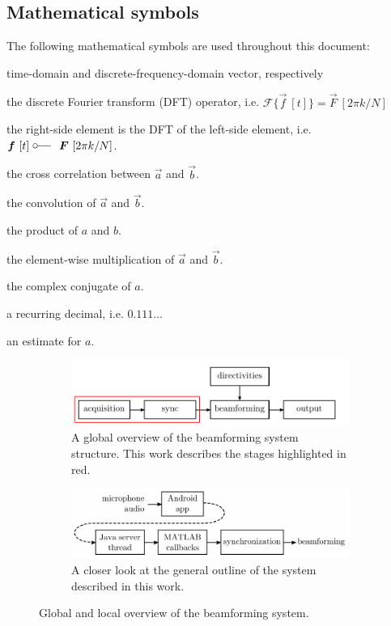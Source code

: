 \documentclass[a4paper, notitlepage]{report}
\begin{document}
\subsection{Mathematical symbols}
The following mathematical symbols are used throughout this document:
\begin{description}[labelwidth=1.5cm]
\item[$\vec{a}, \vec{A}$]	time-domain and discrete-frequency-domain vector, respectively
\item[$\mathcal{F}$]	the discrete Fourier transform (DFT) operator, i.e. $\mathcal{F}\{\vec{f}~[t]\}=\vec{F}~[2\pi k/N]$
\item[$\fourier$]	the right-side element is the DFT of the left-side element, i.e. $\vec{f}~[t]~\fourier~\vec{F}~[2\pi k/N]$.
\item[$\vec{a} \star \vec{b}$]	the cross correlation between $\vec{a}$ and $\vec{b}$.
\item[$\vec{a} * \vec{b}$]		the convolution of $\vec{a}$ and $\vec{b}$.
\item[$a\cdot b$]	the product of $a$ and $b$.
\item[$\vec{a} \odot \vec{b}$]	the element-wise multiplication of $\vec{a}$ and $\vec{b}$.
\item[$\overline{a}$]	the complex conjugate of $a$.
\item[$0.\overline{1}$]	a recurring decimal, i.e. $0.111\dots$
\item[$\hat{a}$]	an estimate for $a$.
\end{description}

\begin{figure}[bht]
	\centering
	\begin{subfigure}{0.8\textwidth}
	\includegraphics[width=\textwidth]{figures/introduction/global_overview}
		\caption[Global overview of the beamforming system structure.]{A global overview of the beamforming system structure. This work describes the stages highlighted in red.}
		\label{fig:global_overview}
	\end{subfigure}
	
	\begin{subfigure}{0.8\textwidth}
		\includegraphics[width=\textwidth]{figures/introduction/local_overview}
		\caption[General outline of system structure in this work.]{A closer look at the general outline of the system described in this work.}
		\label{fig:local_overview}
	\end{subfigure}
	\caption{Global and local overview of the beamforming system.}
\end{figure}
\end{document}
